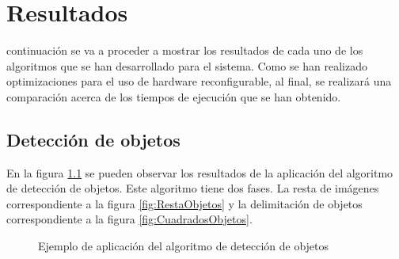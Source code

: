\chapter{Resultados}\label{chap:resultados}

 continuación se va a proceder a mostrar los resultados de cada uno de los algoritmos que se han desarrollado para el sistema. Como se han realizado optimizaciones para el uso de hardware reconfigurable, al final, se realizará una comparación acerca de los tiempos de ejecución que se han obtenido.

\section{Detección de objetos}

En la figura \ref{fig:EstadosLaboratorio} se pueden observar los resultados de la aplicación del algoritmo de detección de objetos. Este algoritmo tiene dos fases. La resta de imágenes correspondiente a la figura \ref{fig:RestaObjetos} y la delimitación de objetos correspondiente a la figura \ref{fig:CuadradosObjetos}.

\begin{figure}[htbp]
 \centering
 \caption{Ejemplo de aplicación del algoritmo de detección de objetos}
 \label{fig:EstadosLaboratorio}
\end{figure}



